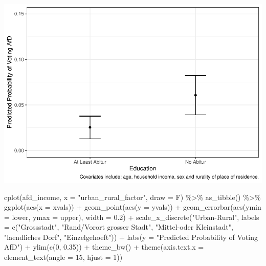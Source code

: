 \documentclass[
]{article}
\newenvironment{Shaded}{\begin{snugshade}}{\end{snugshade}}
\newcommand{\AttributeTok}[1]{\textcolor[rgb]{0.77,0.63,0.00}{#1}}
\newcommand{\DecValTok}[1]{\textcolor[rgb]{0.00,0.00,0.81}{#1}}
\newcommand{\FloatTok}[1]{\textcolor[rgb]{0.00,0.00,0.81}{#1}}
\newcommand{\FunctionTok}[1]{\textcolor[rgb]{0.00,0.00,0.00}{#1}}
\newcommand{\NormalTok}[1]{#1}
\newcommand{\SpecialCharTok}[1]{\textcolor[rgb]{0.00,0.00,0.00}{#1}}
\newcommand{\StringTok}[1]{\textcolor[rgb]{0.31,0.60,0.02}{#1}}
\begin{document}
\includegraphics{AVCD_Final_Assignment-Edenhofer_latest_files/figure-latex/afd-education-1.pdf}

\begin{Shaded}
\begin{Highlighting}[]
\FunctionTok{cplot}\NormalTok{(afd\_income, }\AttributeTok{x =} \StringTok{"urban\_rural\_factor"}\NormalTok{, }\AttributeTok{draw =}\NormalTok{ F) }\SpecialCharTok{\%\textgreater{}\%}
  \FunctionTok{as\_tibble}\NormalTok{() }\SpecialCharTok{\%\textgreater{}\%}
  \FunctionTok{ggplot}\NormalTok{(}\FunctionTok{aes}\NormalTok{(}\AttributeTok{x =}\NormalTok{ xvals)) }\SpecialCharTok{+}
  \FunctionTok{geom\_point}\NormalTok{(}\FunctionTok{aes}\NormalTok{(}\AttributeTok{y =}\NormalTok{ yvals)) }\SpecialCharTok{+}
  \FunctionTok{geom\_errorbar}\NormalTok{(}\FunctionTok{aes}\NormalTok{(}\AttributeTok{ymin =}\NormalTok{ lower, }\AttributeTok{ymax =}\NormalTok{ upper), }\AttributeTok{width =} \FloatTok{0.2}\NormalTok{) }\SpecialCharTok{+}
  \FunctionTok{scale\_x\_discrete}\NormalTok{(}\StringTok{"Urban{-}Rural"}\NormalTok{, }
                   \AttributeTok{labels =} \FunctionTok{c}\NormalTok{(}\StringTok{"Grossstadt"}\NormalTok{, }\StringTok{"Rand/Vorort grosser Stadt"}\NormalTok{,}
                              \StringTok{"Mittel{-}oder Kleinstadt"}\NormalTok{, }\StringTok{"laendliches Dorf"}\NormalTok{,}
                              \StringTok{"Einzelgehoeft"}\NormalTok{)) }\SpecialCharTok{+}
 \FunctionTok{labs}\NormalTok{(}\AttributeTok{y =} \StringTok{"Predicted Probability of Voting AfD"}\NormalTok{) }\SpecialCharTok{+}
 \FunctionTok{ylim}\NormalTok{(}\FunctionTok{c}\NormalTok{(}\DecValTok{0}\NormalTok{, }\FloatTok{0.35}\NormalTok{)) }\SpecialCharTok{+}
 \FunctionTok{theme\_bw}\NormalTok{() }\SpecialCharTok{+}
 \FunctionTok{theme}\NormalTok{(}\AttributeTok{axis.text.x =} \FunctionTok{element\_text}\NormalTok{(}\AttributeTok{angle =} \DecValTok{15}\NormalTok{, }\AttributeTok{hjust =} \DecValTok{1}\NormalTok{))}
\end{Highlighting}
\end{Shaded}
\end{document}
